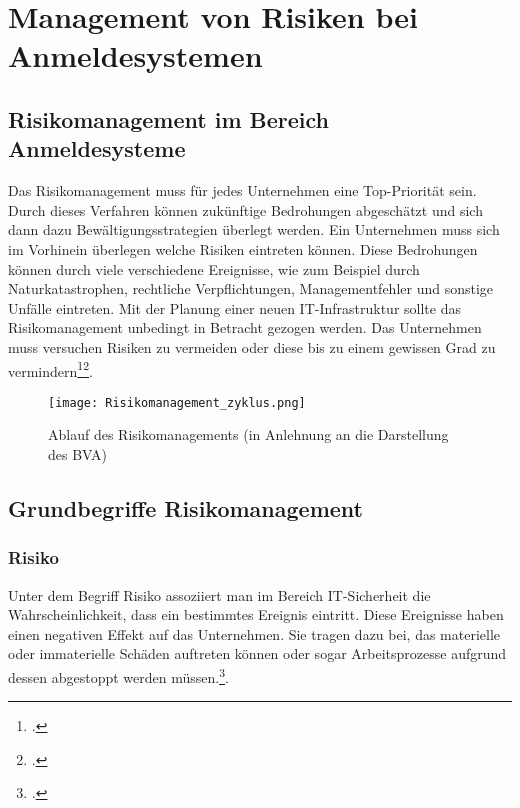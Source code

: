 \chapter{Management von Risiken bei Anmeldesystemen}
\strahlhofer

\section{Risikomanagement im Bereich Anmeldesysteme}
Das Risikomanagement muss für jedes Unternehmen eine Top-Priorität sein. Durch dieses Verfahren können zukünftige Bedrohungen abgeschätzt und sich dann dazu Bewältigungsstrategien überlegt werden. Ein Unternehmen muss sich im Vorhinein überlegen welche Risiken eintreten können. Diese Bedrohungen können durch viele verschiedene Ereignisse, wie zum Beispiel durch Naturkatastrophen, rechtliche Verpflichtungen, Managementfehler und sonstige Unfälle eintreten.
Mit der Planung einer neuen IT-Infrastruktur sollte das Risikomanagement unbedingt in Betracht gezogen werden. Das Unternehmen muss versuchen Risiken zu vermeiden oder diese bis zu einem gewissen Grad zu vermindern\footcite{risikomanagement-diplomarbeit}\footcite{risikoidentifikation-definition}. 

\begin{center}
\begin{figure}[H]
    \centering
    \texttt{[image: Risikomanagement\_zyklus.png]}
    \caption{Ablauf des Risikomanagements (in Anlehnung an die Darstellung des BVA)}
\end{figure}
\end{center}


\section{Grundbegriffe Risikomanagement}
\subsection{Risiko}
Unter dem Begriff Risiko assoziiert man im Bereich IT-Sicherheit die Wahrscheinlichkeit, dass ein bestimmtes Ereignis eintritt. Diese Ereignisse haben einen negativen Effekt auf das Unternehmen. Sie tragen dazu bei, das materielle oder immaterielle Schäden auftreten können oder sogar Arbeitsprozesse aufgrund dessen abgestoppt werden müssen.\footcite{risikomanagement-diplomarbeit}.

